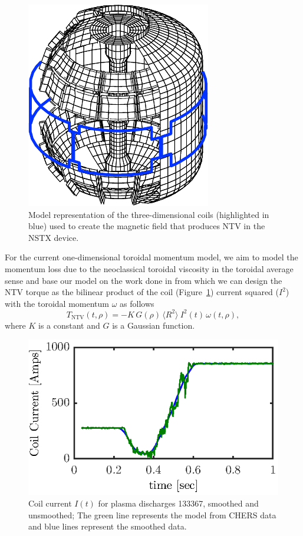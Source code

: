\documentclass{iopart}
\begin{document}
\begin{figure}
	\centering
   \includegraphics{imene_figs/fig5}
\caption{Model representation of the three-dimensional coils (highlighted in
  blue) used to create the magnetic field that produces NTV in the NSTX device.}
  \label{pic_NTV}
\end{figure}
For the current one-dimensional toroidal momentum model, we aim to model the momentum loss due to the neoclassical toroidal viscosity in the toroidal average sense and base our model on the work done in \cite{Zhu06} from which we can design the NTV torque as the bilinear product of the coil (Figure~\ref{pic_NTV}) current squared ($ I^2$) with the toroidal momentum $\omega$ as follows
\begin{equation}
   T_\text{NTV}  (t, \rho) =  - K \, G(\rho) \,  \langle R^2 \rangle \:  I^2(t) \,\omega (t, \rho),
    \label{eqn:ntv}
\end{equation}
where $K$ is a constant and $G$ is a Gaussian function.
\begin{figure}
	\centering
	\includegraphics{imene_figs/fig6}  %
	\caption{ Coil current $I(t)$ for plasma discharges 133367, smoothed and unsmoothed;
          The green line represents the model from CHERS data and  blue lines represent the smoothed data.}
	\label{fig:current}
\end{figure}
\end{document}
